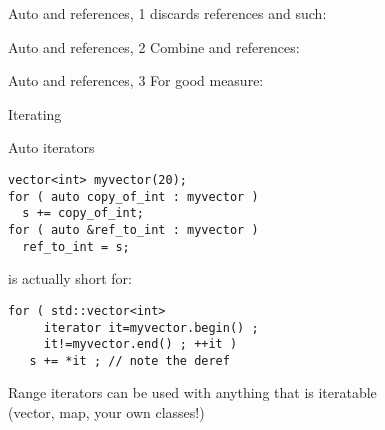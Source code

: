 \begin{block}{Auto and references, 1}
  \label{sl:auto-ref1}
   discards references and such:
\end{block}

\begin{block}{Auto and references, 2}
  \label{sl:auto-ref2}
  Combine  and references:
\end{block}

\begin{block}{Auto and references, 3}
  \label{sl:auto-ref3}
  For good measure:
\end{block}

\begin{comment}
  \begin{block}{Auto plus}
    \label{sl:auto-plus-const}
    Keywords like \n{const} and the reference character~\n{\&} can be
    added:
\begin{lstlisting}
// class member
  some_object my_object;
// class method:
  some_object &get_some_object() { return my_object; };
// main program:
auto object_copy  = thing.get_some_object();
auto &object_mutable  = thing.get_some_object();
const auto &object_immutable  = thing.get_some_object();
\end{lstlisting}
  \end{block}
\end{comment}

 {Iterating}

\begin{block}{Auto iterators}
  \label{sl:auto-iterator}
  \begin{multicols}{2}
\begin{lstlisting}
vector<int> myvector(20);
for ( auto copy_of_int : myvector )
  s += copy_of_int;
for ( auto &ref_to_int : myvector )
  ref_to_int = s;
\end{lstlisting}
    is actually short for:
\begin{lstlisting}
for ( std::vector<int>
     iterator it=myvector.begin() ;
     it!=myvector.end() ; ++it )
   s += *it ; // note the deref
\end{lstlisting}
  \end{multicols}
  Range iterators can be used with anything that is iteratable\\
  (vector, map, your own classes!)
\end{block}

